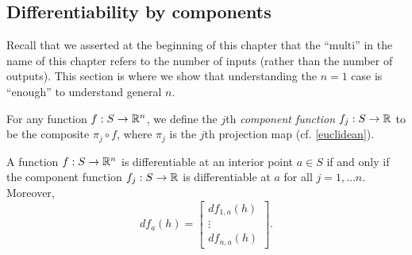\subsection{Differentiability by components}

Recall that we asserted at the beginning of this chapter that the ``multi'' in the name of this chapter refers to the number of inputs (rather than the number of outputs). This section is where we show that understanding the $n = 1$ case is ``enough'' to understand general $n$.

\begin{definition} 
	For any function $f : S \to \mathbb{R}^n$, we define the $j$th \emph{component function} $f_j : S \to \mathbb{R}$ to be the composite $\pi_j \circ f$, where $\pi_j$ is the $j$th projection map (cf. \cref{euclidean}).
\end{definition}

\begin{proposition} \label{differentiable-by-components}
	A function $f : S \to \mathbb{R}^n$ is differentiable at an interior point $a \in S$ if and only if the component function $f_j : S \to \mathbb{R}$ is differentiable at $a$ for all $j = 1, \dotsc n$. Moreover,
	\begin{equation} \label{derivative-of-components} df_a(h) = \begin{bmatrix} df_{1,a}(h) \\ \vdots \\ df_{n,a}(h) \end{bmatrix}. \end{equation}
\end{proposition}

